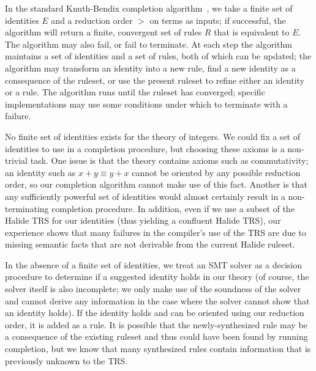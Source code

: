 In the standard Knuth-Bendix completion algorithm~\cite{knuth1983simple}, we take a
finite set of identities $E$ and a reduction order $>$ on terms as inputs; if successful, the
algorithm will return a finite, convergent set of rules $R$ that is equivalent to 
$E$. The algorithm may also fail, or fail to terminate. At each step the algorithm
maintains a set of identities and a set of rules, both of which can be updated; the 
algorithm may transform an identity into a new rule, find a new identity as a 
consequence of the ruleset, or use the present ruleset to refine either an identity 
or a rule. The algorithm runs until the ruleset has converged; specific implementations
may use some conditions under which to terminate with a failure.

No finite set of identities exists for the theory of integers. We could
fix a set of identities to use in a completion procedure, but choosing these axioms
is a non-trivial task. One issue is that the theory contains axioms such as commutativity;
an identity such as $x + y \equiv y + x$ cannot be oriented by any possible reduction 
order, so our completion algorithm cannot make use of this fact. Another is that any
sufficiently powerful set of identities would almost certainly result in a non-terminating
completion procedure.  In addition, even if we use a subset of the Halide TRS for our
identities (thus yielding a confluent Halide TRS), our experience shows that many
failures in the compiler's use of the TRS are due to missing semantic facts that are not
derivable from the current Halide ruleset.


In the absence of a finite set of identities, we
treat an SMT solver as a decision procedure to determine if a suggested identity 
holds in our theory (of course, the solver itself is also incomplete; we only make use of the 
soundness of the solver and cannot derive any information in the case where the solver cannot
show that an identity holds). If the identity holds and can be oriented using our reduction order, 
it is added as a rule. It is possible that the newly-synthesized rule may be a consequence 
of the existing ruleset and thus could have been found by running completion, 
but we know that many synthesized rules contain information that is previously 
unknown to the TRS.

